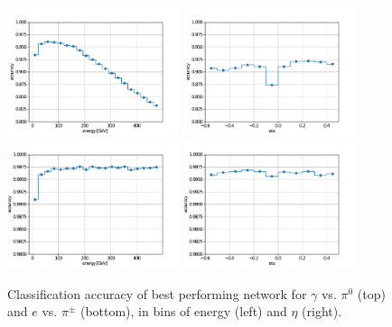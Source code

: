 \begin{figure}[htbp]
\centering
\includegraphics[width=0.45\textwidth]{Images/Calo/gamma_pi0_accuracy_energy_bins.pdf}
\includegraphics[width=0.45\textwidth]{Images/Calo/gamma_pi0_accuracy_eta_bins.pdf} \\
\includegraphics[width=0.45\textwidth]{Images/Calo/ele_chpi_accuracy_energy_bins.pdf}
\includegraphics[width=0.45\textwidth]{Images/Calo/ele_chpi_accuracy_eta_bins.pdf}
\caption{Classification accuracy of best performing network for $\gamma$ vs. $\pi^0$ (top) and $e$ vs. $\pi^\pm$ (bottom), in bins of energy (left) and $\eta$ (right).}
\label{fig:accuracy_bins}
\end{figure}